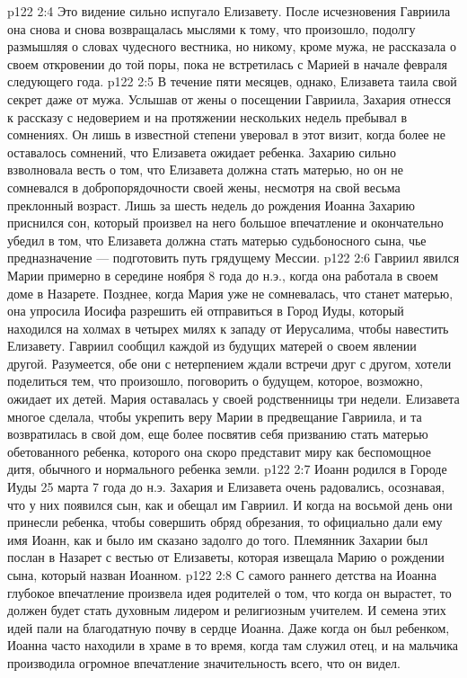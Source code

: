 \vs p122 2:4 Это видение сильно испугало Елизавету. После исчезновения Гавриила она снова и снова возвращалась мыслями к тому, что произошло, подолгу размышляя о словах чудесного вестника, но никому, кроме мужа, не рассказала о своем откровении до той поры, пока не встретилась с Марией в начале февраля следующего года.
\vs p122 2:5 \pc В течение пяти месяцев, однако, Елизавета таила свой секрет даже от мужа. Услышав от жены о посещении Гавриила, Захария отнесся к рассказу с недоверием и на протяжении нескольких недель пребывал в сомнениях. Он лишь в известной степени уверовал в этот визит, когда более не оставалось сомнений, что Елизавета ожидает ребенка. Захарию сильно взволновала весть о том, что Елизавета должна стать матерью, но он не сомневался в добропорядочности своей жены, несмотря на свой весьма преклонный возраст. Лишь за шесть недель до рождения Иоанна Захарию приснился сон, который произвел на него большое впечатление и окончательно убедил в том, что Елизавета должна стать матерью судьбоносного сына, чье предназначение --- подготовить путь грядущему Мессии.
\vs p122 2:6 Гавриил явился Марии примерно в середине ноября 8 года до н.э., когда она работала в своем доме в Назарете. Позднее, когда Мария уже не сомневалась, что станет матерью, она упросила Иосифа разрешить ей отправиться в Город Иуды, который находился на холмах в четырех милях к западу от Иерусалима, чтобы навестить Елизавету. Гавриил сообщил каждой из будущих матерей о своем явлении другой. Разумеется, обе они с нетерпением ждали встречи друг с другом, хотели поделиться тем, что произошло, поговорить о будущем, которое, возможно, ожидает их детей. Мария оставалась у своей родственницы три недели. Елизавета многое сделала, чтобы укрепить веру Марии в предвещание Гавриила, и та возвратилась в свой дом, еще более посвятив себя призванию стать матерью обетованного ребенка, которого она скоро представит миру как беспомощное дитя, обычного и нормального ребенка земли.
\vs p122 2:7 \pc Иоанн родился в Городе Иуды 25 марта 7 года до н.э. Захария и Елизавета очень радовались, осознавая, что у них появился сын, как и обещал им Гавриил. И когда на восьмой день они принесли ребенка, чтобы совершить обряд обрезания, то официально дали ему имя Иоанн, как и было им сказано задолго до того. Племянник Захарии был послан в Назарет с вестью от Елизаветы, которая извещала Марию о рождении сына, который назван Иоанном.
\vs p122 2:8 С самого раннего детства на Иоанна глубокое впечатление произвела идея родителей о том, что когда он вырастет, то должен будет стать духовным лидером и религиозным учителем. И семена этих идей пали на благодатную почву в сердце Иоанна. Даже когда он был ребенком, Иоанна часто находили в храме в то время, когда там служил отец, и на мальчика производила огромное впечатление значительность всего, что он видел.
